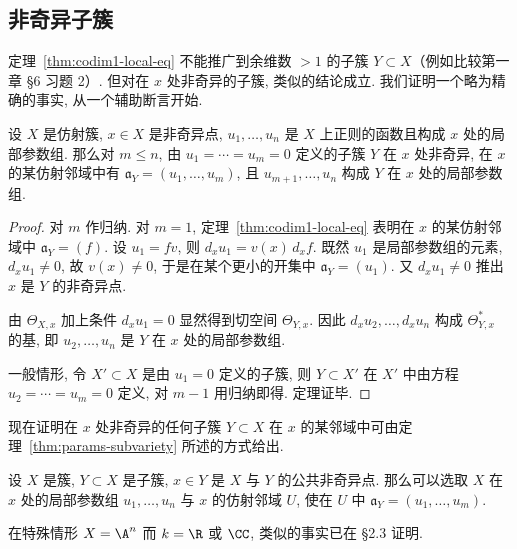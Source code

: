 \subsection{非奇异子簇}

定理~\ref{thm:codim1-local-eq} 不能推广到余维数 $> 1$ 的子簇 $Y \subset X$（例如比较第一章 §6 习题 2）. 但对在 $x$ 处非奇异的子簇, 类似的结论成立. 我们证明一个略为精确的事实, 从一个辅助断言开始.

\begin{theorem}\label{thm:params-subvariety}
	设 $X$ 是仿射簇, $x \in X$ 是非奇异点, $u_1, \ldots, u_n$ 是 $X$ 上正则的函数且构成 $x$ 处的局部参数组. 那么对 $m \le n$, 由 $u_1 = \cdots = u_m = 0$ 定义的子簇 $Y$ 在 $x$ 处非奇异, 在 $x$ 的某仿射邻域中有 $\mathfrak a_Y = (u_1, \ldots, u_m)$, 且 $u_{m+1}, \ldots, u_n$ 构成 $Y$ 在 $x$ 处的局部参数组.
\end{theorem}

\begin{proof}
	对 $m$ 作归纳. 对 $m = 1$, 定理~\ref{thm:codim1-local-eq} 表明在 $x$ 的某仿射邻域中 $\mathfrak a_Y = (f)$. 设 $u_1 = f v$, 则 $d_x u_1 = v(x)\, d_x f$. 既然 $u_1$ 是局部参数组的元素, $d_x u_1 \ne 0$, 故 $v(x) \ne 0$, 于是在某个更小的开集中 $\mathfrak a_Y = (u_1)$. 又 $d_x u_1 \ne 0$ 推出 $x$ 是 $Y$ 的非奇异点.

	由 $\Theta_{X,x}$ 加上条件 $d_x u_1 = 0$ 显然得到切空间 $\Theta_{Y,x}$. 因此 $d_x u_2, \ldots, d_x u_n$ 构成 $\Theta_{Y,x}^*$ 的基, 即 $u_2, \ldots, u_n$ 是 $Y$ 在 $x$ 处的局部参数组.

	一般情形, 令 $X' \subset X$ 是由 $u_1 = 0$ 定义的子簇, 则 $Y \subset X'$ 在 $X'$ 中由方程 $u_2 = \cdots = u_m = 0$ 定义, 对 $m-1$ 用归纳即得. 定理证毕.
\end{proof}

现在证明在 $x$ 处非奇异的任何子簇 $Y \subset X$ 在 $x$ 的某邻域中可由定理~\ref{thm:params-subvariety} 所述的方式给出.

\begin{theorem}\label{thm:subvariety-local-params}
	设 $X$ 是簇, $Y \subset X$ 是子簇, $x \in Y$ 是 $X$ 与 $Y$ 的公共非奇异点. 那么可以选取 $X$ 在 $x$ 处的局部参数组 $u_1, \ldots, u_n$ 与 $x$ 的仿射邻域 $U$, 使在 $U$ 中 $\mathfrak a_Y = (u_1, \ldots, u_m)$.
\end{theorem}

在特殊情形 $X = \A^n$ 而 $k = \R$ 或 $\CC$, 类似的事实已在 §2.3 证明.

